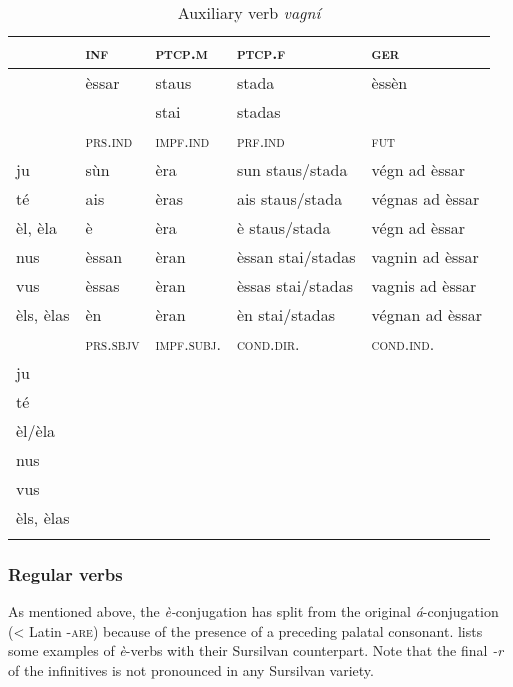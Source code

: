 \begin{table}
\caption{Auxiliary verb \textit{vagní}}
\label{tab:aux:vagní}
 \begin{tabular}{lllll} %
 
  \lsptoprule
 & \textsc{inf}  & \textsc{ptcp.m}  & \textsc{ptcp.f}  &  \textsc{ger}\\
  \midrule
  &èssar &staus & stada & èssèn\\
  &&stai &stadas\\
   
  \lsptoprule
    &\textsc{prs.ind}  &\textsc{impf.ind} & \textsc{prf.ind} & \textsc{fut}\\
   \midrule
ju &sùn & èra &sun staus/stada &végn ad èssar\\
té &ais &èras &ais staus/stada & végnas ad èssar\\
èl, èla &è & èra &è staus/stada &végn ad èssar\\
nus &èssan &èran &èssan stai/stadas &vagnin ad èssar\\
vus &èssas & èran &èssas stai/stadas &vagnis ad èssar\\
èls, èlas& èn & èran &èn stai/stadas &végnan ad èssar\\

 \lsptoprule
   &\textsc{prs.sbjv} & \textsc{impf.subj.}  &\textsc{cond.dir.} & \textsc{cond.ind.}\\
\midrule
ju& &&& \\
té\\
èl/èla\\
nus\\
vus\\
èls, èlas\\
  \lspbottomrule
 \end{tabular}
\end{table}




\subsubsection{Regular verbs}
As mentioned above, the \textit{è-}conjugation has split from the original \textit{á}-conjugation (< Latin \textsc{-are})  because of the presence of a preceding palatal consonant.  lists some examples of \textit{è}-verbs with their Sursilvan counterpart. Note that the final \textit{-r} of the infinitives is not pronounced in any Sursilvan variety.

